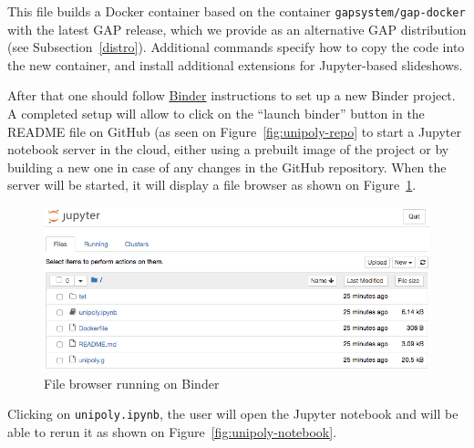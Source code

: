\documentclass{deliverablereport}
\begin{document}
This file builds a Docker container based on the container {\tt gapsystem/gap-docker}
with the latest GAP release, which we provide as an alternative GAP distribution
(see Subsection~\ref{distro}). Additional commands specify how to copy the code into
the new container, and install additional extensions for Jupyter-based slideshows.

After that one should follow \href{https://mybinder.org/}{Binder} instructions to
set up a new Binder project. A completed setup will allow to click on the ``launch binder''
button in the README file on GitHub (as seen on Figure~\ref{fig:unipoly-repo}
to start a Jupyter notebook server in the cloud,
either using a prebuilt image of the project or by building a new one in case of any
changes in the GitHub repository. When the server will be started, it will display
a file browser as shown on Figure~\ref{fig:unipoly-files}.

\begin{figure}[!ht]
    \centering
    \includegraphics[width=\textwidth]{images/unipoly-files}
    \caption{File browser running on Binder}
    \label{fig:unipoly-files}
\end{figure}

Clicking on {\tt unipoly.ipynb}, the user will open the Jupyter notebook
and will be able to rerun it as shown on Figure~\ref{fig:unipoly-notebook}.
\end{document}
